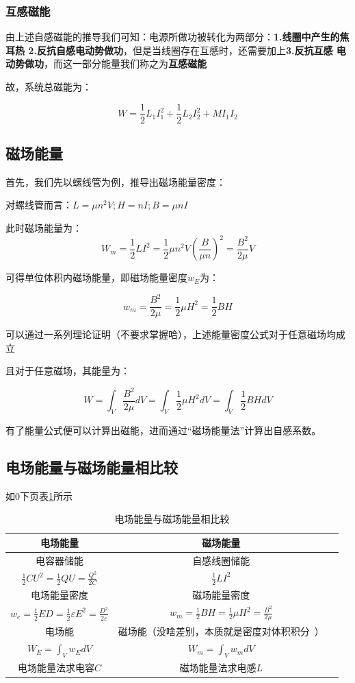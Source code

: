 \documentclass{ctexart}
\begin{document}
\subsubsection{互感磁能}

由上述自感磁能的推导我们可知：电源所做功被转化为两部分：\textbf{1.线圈中产生的焦耳热
2.反抗自感电动势做功}，但是当线圈存在互感时，还需要加上\textbf{3.反抗互感
电动势做功}，而这一部分能量我们称之为\textbf{互感磁能}

故，系统总磁能为：

$$W=\frac{1}{2}L_1I_1^2+\frac{1}{2}L_2I_2^2+MI_1I_2$$

\subsection{磁场能量}

首先，我们先以螺线管为例，推导出磁场能量密度：

对螺线管而言：$L=\mu n^2V;H=nI;B=\mu nI$

此时磁场能量为：
$$W_m=\frac{1}{2}LI^2=\frac{1}{2}\mu n^2V \left(\frac{B}{\mu n}
\right)^2=\frac{B^2}{2\mu }V$$

可得单位体积内磁场能量，即磁场能量密度$w_E$为：

$$w_m=\frac{B^2}{2\mu }=\frac{1}{2}\mu H^2=\frac{1}{2}BH$$

可以通过一系列理论证明（不要求掌握哈），上述能量密度公式对于任意磁场均成立

且对于任意磁场，其能量为：

$$W=\int_V\frac{B^2}{2\mu }dV=\int_V\frac{1}{2}\mu H^2dV=\int_V \frac{1}{2}BHdV$$

有了能量公式便可以计算出磁能，进而通过“磁场能量法”计算出自感系数。

\subsection{电场能量与磁场能量相比较}

如0下页表\ref{table_1}所示

\begin{table}[h] 
	\centering 
	\renewcommand\arraystretch{1.7}  %
\begin{tabular}{c c l}
\toprule 
	\textbf{电场能量} & \textbf{磁场能量}  \\
\midrule 
	电容器储能 & 自感线圈储能 \\
	$\frac{1}{2}CU^2=\frac{1}{2}QU=\frac{Q^2}{2C}$ & $\frac{1}{2}LI^2$ \\
	\hline
	电场能量密度 & 磁场能量密度 \\
	$w_e=\frac{1}{2}ED=\frac{1}{2}\varepsilon E^2=\frac{D^2}{2\varepsilon}$	&
	$w_m=\frac{1}{2}BH=\frac{1}{2}\mu H^2=\frac{B^2}{2\mu }$ \\
	\hline
	电场能 & 磁场能（没啥差别，本质就是密度对体积积分~）\\
	$W_E=\int_V w_EdV$ & $W_m=\int_V w_mdV$\\
	\hline
	电场能量法求电容$C$ & 磁场能量法求电感$L$ \\

	\bottomrule 
\end{tabular}
\caption{电场能量与磁场能量相比较}\label{table_1}
\end{table}
\end{document}
